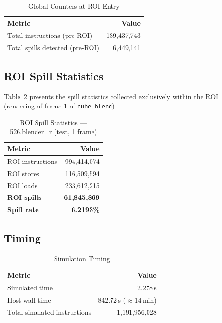 \documentclass[conference]{IEEEtran}
\begin{document}
\begin{table}[H]
\centering
\caption{Global Counters at ROI Entry}
\label{tab:preroi}
\begin{tabular}{lr}
\toprule
\textbf{Metric} & \textbf{Value} \\
\midrule
Total instructions (pre-ROI) & 189,437,743 \\
Total spills detected (pre-ROI) & 6,449,141 \\
\bottomrule
\end{tabular}
\end{table}

\subsection{ROI Spill Statistics}

Table~\ref{tab:roi} presents the spill statistics collected exclusively
within the ROI (rendering of frame 1 of \texttt{cube.blend}).

\begin{table}[H]
\centering
\caption{ROI Spill Statistics --- 526.blender\_r (test, 1 frame)}
\label{tab:roi}
\begin{tabular}{lr}
\toprule
\textbf{Metric} & \textbf{Value} \\
\midrule
ROI instructions         &   994,414,074 \\
ROI stores               &   116,509,594 \\
ROI loads                &   233,612,215 \\
\midrule
\textbf{ROI spills}      & \textbf{61,845,869} \\
\textbf{Spill rate}      & \textbf{6.2193\%} \\
\bottomrule
\end{tabular}
\end{table}

\subsection{Timing}

\begin{table}[H]
\centering
\caption{Simulation Timing}
\label{tab:timing}
\begin{tabular}{lr}
\toprule
\textbf{Metric} & \textbf{Value} \\
\midrule
Simulated time  & 2.278\,s \\
Host wall time  & 842.72\,s ($\approx$14\,min) \\
Total simulated instructions & 1,191,956,028 \\
\bottomrule
\end{tabular}
\end{table}
\end{document}
